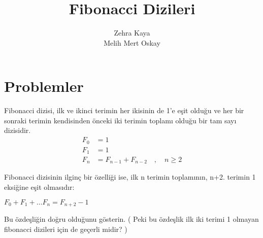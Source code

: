 \documentclass{article}
\title{Fibonacci Dizileri}
\author{Zehra Kaya \\ Melih Mert Oskay}
\begin{document}
\maketitle



\section*{Problemler}



Fibonacci dizisi, ilk ve ikinci terimin her ikisinin de 1’e eşit olduğu ve her bir sonraki terimin kendisinden önceki iki terimin toplamı olduğu bir tam sayı dizisidir.
\begin{align*}
F_0 &= 1\\
F_1 &= 1\\
F_n &= F_{n-1} + F_{n-2} \quad , \quad n \geq 2
\end{align*}

Fibonacci dizisinin ilginç bir özelliği ise, ilk n terimin toplamının, n+2. terimin 1 eksiğine eşit olmasıdır:\\
\begin{center}
    $F_0 + F_1 + \dots F_n = F_{n+2} -1 $\\
\end{center}


    

Bu özdeşliğin doğru olduğunu gösterin. ( Peki bu özdeşlik ilk iki terimi 1 olmayan fibonacci dizileri için de geçerli midir? )
\end{document}
